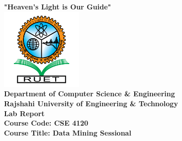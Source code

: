 \documentclass[12pt,a4paper]{article}
\begin{document}

\begin{titlepage}
    \thispagestyle{empty}
    \centering
    
    {\large \textbf{"Heaven's Light is Our Guide"}}\\[0.3cm]
    
    \includegraphics[width=4cm]{ruet_logo.png} \\[0.4cm]
    
    {\Large \textbf{Department of Computer Science \& Engineering}}\\[0.3cm]
    {\large \textbf{Rajshahi University of Engineering \& Technology}}\\[0.8cm]

    \vspace{0.8cm}
    {\LARGE \textbf{Lab Report}}\\[0.4cm]

    \vspace{0.5cm}
    {\Large \textbf{Course Code: CSE 4120}}\\[0.3cm]
    {\Large \textbf{Course Title: Data Mining Sessional}}\\[0.4cm]
    

\end{titlepage}
\end{document}
